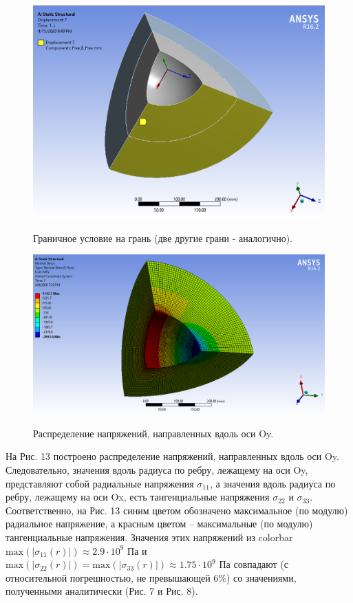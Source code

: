 \documentclass[a4paper,12pt]{article}	%
\begin{document}
\begin{figure}[H]
  \centering
  \includegraphics[scale=0.5]{img/Boundary.png}\\
  \caption{Граничное условие на грань (две другие грани - аналогично).}
  \label{fig_12}
\end{figure}

\begin{figure}[H]
  \centering
  \includegraphics[scale=0.45]{img/Results_NS_Y_Axis.png}\\
  \caption{Распределение напряжений, направленных вдоль оси Oy.}
  \label{fig_13}
\end{figure}

На Рис. 13 построено распределение напряжений, направленных вдоль оси Oy. Следовательно, значения вдоль радиуса по ребру, лежащему на оси Oy, представляют собой радиальные напряжения $\sigma_{11}$, а значения вдоль радиуса по ребру, лежащему на оси Ox, есть тангенциальные напряжения $\sigma_{22}$ и $\sigma_{33}$. Соответственно, на Рис. 13 синим цветом обозначено максимальное (по модулю) радиальное напряжение, а красным цветом -- максимальные (по модулю) тангенциальные напряжения. Значения этих напряжений из colorbar $\mathrm{max}(\left|\sigma_{11}(r)\right|)\approx2.9\cdot10^{9}$ Па и $\mathrm{max}(\left|\sigma_{22}(r)\right|)=\mathrm{max}(\left|\sigma_{33}(r)\right|)\approx1.75\cdot10^{9}$ Па совпадают (с относительной погрешностью, не превышающей $6\%$) со значениями, полученными аналитически (Рис. 7 и Рис. 8).
\end{document}
